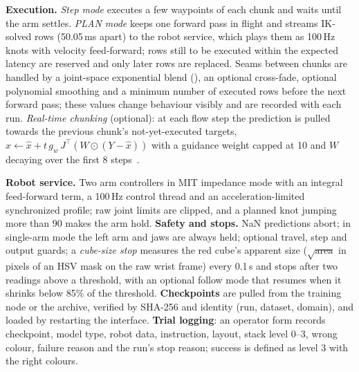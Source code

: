 \documentclass[conference,10pt]{IEEEtran}
\begin{document}
\textbf{Execution.} \emph{Step mode} executes a few waypoints of each chunk and waits until the arm settles. \emph{PLAN mode} keeps one
forward pass in flight and streams IK-solved rows (50.05\,ms apart) to the robot service, which plays them as 100\,Hz knots with
velocity feed-forward; rows still to be executed within the expected latency are reserved and only later rows are replaced. Seams
between chunks are handled by a joint-space exponential blend (), an optional cross-fade, optional polynomial
smoothing and a minimum number of executed rows before the next forward pass; these values change behaviour visibly and are recorded
with each run. \emph{Real-time chunking} (optional): at each flow step the prediction is pulled towards the previous chunk's
not-yet-executed targets, $\hat x\leftarrow\hat x+t\,g_w\,J^\top(W\odot(Y-\hat x))$ with a guidance weight capped at 10 and $W$ decaying
over the first 8 steps~\cite{black2025rtc}.

\textbf{Robot service.} Two arm controllers in MIT impedance mode with an integral feed-forward term, a 100\,Hz control thread and an
acceleration-limited synchronized profile; raw joint limits are clipped, and a planned knot jumping more than 90\textdegree{} makes
the arm hold. \textbf{Safety and stops.} NaN predictions abort; in single-arm mode the left arm and jaws are always held; optional
travel, step and output guards; a \emph{cube-size stop} measures the red cube's apparent size ($\sqrt{\text{area}}$ in pixels of an
HSV mask on the raw wrist frame) every 0.1\,s and stops after two readings above a threshold, with an optional follow mode that
resumes when it shrinks below 85\% of the threshold. \textbf{Checkpoints} are pulled from the training node or the archive, verified
by SHA-256 and identity (run, dataset, domain), and loaded by restarting the interface. \textbf{Trial logging}: an operator form
records checkpoint, model type, robot data, instruction, layout, stack level 0--3, wrong colour, failure reason and the run's stop
reason; success is defined as level 3 with the right colours.
\end{document}
